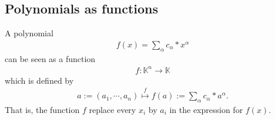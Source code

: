 \documentclass[11pt]{book}
\begin{document}
\subsection{Polynomials as functions}
A polynomial
\begin{eqnarray}
f(x) = \sum_\alpha c_\alpha * x^\alpha
\end{eqnarray}
can be seen as a function
\begin{eqnarray}
f : \mathbb{K}^n \to \mathbb{K}
\end{eqnarray}
which is defined by
\begin{eqnarray}
a:=(a_1, \cdots, a_n) \stackrel{f}{\mapsto} f(a) := \sum_\alpha c_\alpha * a^\alpha.
\end{eqnarray}
That is, the function $f$ replace every $x_i$ by $a_i$ in the expression for $f(x)$.
\end{document}
